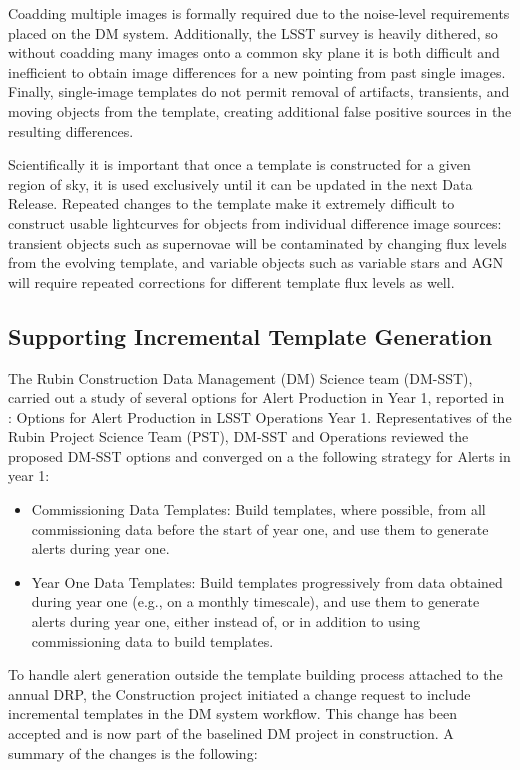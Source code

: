 Coadding multiple images is formally required due to the noise-level requirements placed on the DM system.
Additionally, the LSST survey is heavily dithered, so without coadding many images onto a common sky plane it is both difficult and inefficient to obtain image differences for a new pointing from past single images.
Finally, single-image templates do not permit removal of artifacts, transients, and moving objects from the template, creating additional false positive sources in the resulting differences.

Scientifically it is important that once a template is constructed for a given region of sky, it is used exclusively until it can be updated in the next Data Release.
Repeated changes to the template make it extremely difficult to construct usable lightcurves for objects from individual difference image sources: transient objects such as supernovae will be contaminated by changing flux levels from the evolving template, and variable objects such as variable stars and AGN will require repeated corrections for different template flux levels as well.

\subsection{Supporting Incremental Template Generation}

The Rubin Construction Data Management (DM) Science team (DM-SST), carried out a study of several options for Alert Production in Year 1, reported in  : Options for Alert Production in LSST Operations Year 1.  
Representatives of the Rubin Project Science Team (PST), DM-SST and Operations reviewed the proposed DM-SST options  and converged on a the following  strategy for Alerts in year 1:

\begin{itemize}
\item Commissioning Data Templates: Build templates, where possible, from all commissioning data before the start of year one, and use them to generate alerts during year one. 
\item Year One Data Templates: Build templates progressively from data obtained during year one (e.g., on a monthly timescale), and use them to generate alerts during year one, either instead of, or in addition to using commissioning data to build templates.
\end{itemize}

To handle alert generation outside the template building process attached to the annual DRP, the Construction project initiated a change request to include incremental templates in the DM system workflow. This change has been accepted and is now part of the baselined DM project in construction. A summary of the changes is the following:

